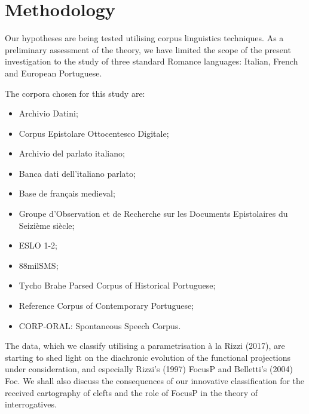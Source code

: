 \documentclass[fleqn,10pt]{wlscirep}
\begin{document}
\section*{Methodology}

Our hypotheses are being tested utilising corpus linguistics techniques. 
As a preliminary assessment of the theory, we have limited the scope of the present investigation to the study of three standard Romance languages: Italian, French and European Portuguese. 

The corpora chosen for this study are: 

\begin{itemize}
\item Archivio Datini;
\item \vspace*{-2mm} Corpus Epistolare Ottocentesco Digitale;
\item \vspace*{-2mm} Archivio del parlato italiano;
\item \vspace*{-2mm} Banca dati dell’italiano parlato;
\item \vspace*{-2mm} Base de français medieval;
\item \vspace*{-2mm} Groupe d’Observation et de Recherche sur les Documents Epistolaires du Seizième siècle;
\item \vspace*{-2mm} ESLO 1-2;
\item \vspace*{-2mm} 88milSMS; 
\item \vspace*{-2mm} Tycho Brahe Parsed Corpus of Historical Portuguese;
\item \vspace*{-2mm} Reference Corpus of Contemporary Portuguese;
\item \vspace*{-2mm} CORP-ORAL: Spontaneous Speech Corpus.
\end{itemize}

The data, which we classify utilising a parametrisation à la Rizzi (2017), are starting to shed light on the diachronic evolution of the functional projections under consideration, and especially Rizzi’s (1997) FocusP and Belletti’s (2004) Foc. We shall also discuss the consequences of our innovative classification for the received cartography of clefts and the role of FocusP in the theory of interrogatives. 
\end{document}
